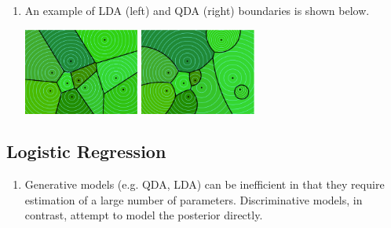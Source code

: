 \documentclass[10pt]{article}
\begin{document}
\begin{multicols}{2}
\begin{addmargin}[0.8em]{0.5em}
\begin{enumerate}[label=(\alph*)]
        \item An example of LDA (left) and QDA (right) boundaries is shown below.
        \begin{center}
            \includegraphics[width=3.8cm]{lda1.png}
            \includegraphics[width=3.8cm]{qda1.png}
        \end{center}
    \end{enumerate}
    
    \subsection{Logistic Regression}
    \begin{enumerate}[label=(\alph*)]
        \item Generative models (e.g. QDA, LDA) can be inefficient in that they require estimation of a large number of parameters. Discriminative models, in contrast, attempt to model the posterior directly.
       

\end{enumerate}
\end{addmargin}
\end{multicols}
\end{document}
